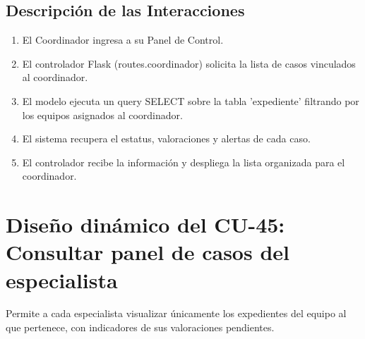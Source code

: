 \subsection{Descripción de las Interacciones}
\begin{enumerate}
    \item El Coordinador ingresa a su Panel de Control.
    \item El controlador Flask (routes.coordinador) solicita la lista de casos vinculados al coordinador.
    \item El modelo ejecuta un query SELECT sobre la tabla 'expediente' filtrando por los equipos asignados al coordinador.
    \item El sistema recupera el estatus, valoraciones y alertas de cada caso.
    \item El controlador recibe la información y despliega la lista organizada para el coordinador.
\end{enumerate}

\cleardoublepage
\section{Diseño dinámico del CU-45: Consultar panel de casos del especialista}
\label{sec:disenoDinamicoCU45}

Permite a cada especialista visualizar únicamente los expedientes del equipo al que pertenece, con indicadores de sus valoraciones pendientes.

